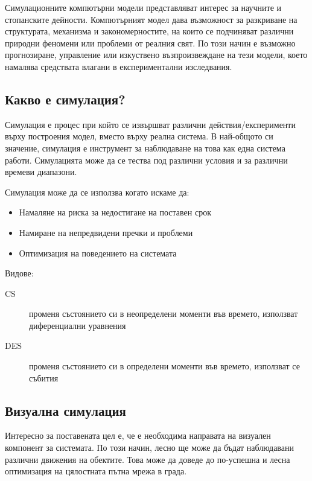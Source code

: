		Симулационните компютърни модели представляват интерес за научните и
		стопанските дейности. Компютърният модел дава възможност за разкриване на структурата,
		механизма и закономерностите, на които се подчиняват различни природни феномени или
		проблеми от реалния свят. По този начин е възможно прогнозиране, управление или
		изкуствено възпроизвеждане на тези модели, което намалява средствата влагани в
		експериментални изследвания. \cite{Iliev}
		
	\subsection{Какво е симулация?}
	
		Симулация е процес при който се извършват различни действия/експерименти върху построения модел, 
		вместо върху реална система. В най-общото си значение, симулация е инструмент за наблюдаване на това
		как една система работи. Симулацията може да се тества под различни условия и за различни времеви диапазони.
		
		Симулация може да се използва когато искаме да:
		
		\begin{itemize}
			\item Намаляне на риска за недостигане на поставен срок		
 			\item Намиране на непредвидени пречки и проблеми
 			\item Оптимизация на поведението на системата
		\end{itemize}
		
		Видове:
		
		\begin{description}
			\item[\ac{CS}] променя състоянието си в неопределени моменти във времето,
			 използват диференциални уравнения
			\item[\ac{DES}] променя състоянието си в определени моменти във
			 времето, използват се събития
		\end{description}
		
	\subsection{Визуална симулация}
	
		Интересно за поставената цел е, че е необходима направата на визуален компонент за системата.
		По този начин, лесно ще може да бъдат наблюдавани различни движения на обектите. Това може да 
		доведе до по-успешна и лесна оптимизация на цялостната пътна мрежа в града.
		
